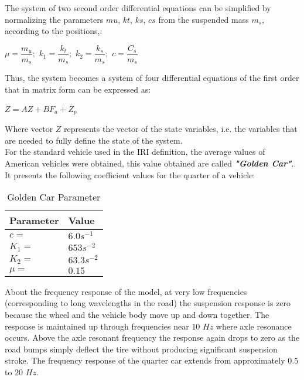 \documentclass[tesi]{subfiles}
\begin{document}
\noindent The system of two second order differential equations can be simplified by normalizing the parameters $mu$, $kt$, $ks$, $cs$ from the suspended mass $m_{s}$, according to the positions,\cite{gillespie1992everything}:

        \begin{center}
       		$\mu = \dfrac{m_{u}}{m_{s}}; $
        	$k_{1} = \dfrac{k_{t}}{m_{s}} ; $
        	$k_{2} = \dfrac{k_{s}}{m_{s}} ; $
       		$c = \dfrac{C_{s}}{m_{s}}$
		\end{center}


\noindent Thus, the system becomes a system of four differential equations of the first order that in matrix form can be expressed as:
\begin{center}

$\dot{Z} = AZ + BF_{a} + \dot{Z_{p}}$
\end{center}

\noindent Where vector $Z$ represents the vector of the state variables, i.e. the variables that are needed to fully define the state of the system. \\For the standard vehicle used in the IRI definition, the average values of American vehicles were obtained, this value obtained are called \textbf{\textit{"Golden Car"}}.\cite{little_book}.
It presents the following coefficient values for the quarter of a vehicle:


\begin{table}[ht]\label{table:Golden Car Parameter}
\centering
    \begin{tabular}{ | l | l |}

    \hline
    Parameter  & Value \\ \hline


    $c =$ & $6.0s^{-1}$\\ \hline
    $K_{1} =$ & $653s^{-2}$\\ \hline
    $K_{2} =$ & $63.3s^{-2}$\\ \hline
    $\mu =$ & $0.15$\\ \hline

\hline
    \end{tabular}
 \caption{Golden Car Parameter}
\end{table}

\noindent About the frequency response of the model, at very low frequencies (corresponding to long wavelengths in the road) the suspension response is zero because the wheel and the vehicle body move up and down together. The response is maintained up through frequencies near $10$ $Hz$ where axle resonance occurs. Above the axle resonant frequency the response again drops to zero as the road bumps simply deflect the tire without producing significant suspension stroke.
The frequency response of the quarter car extends from approximately $0.5$ to $20$ $Hz$.
\end{document}
